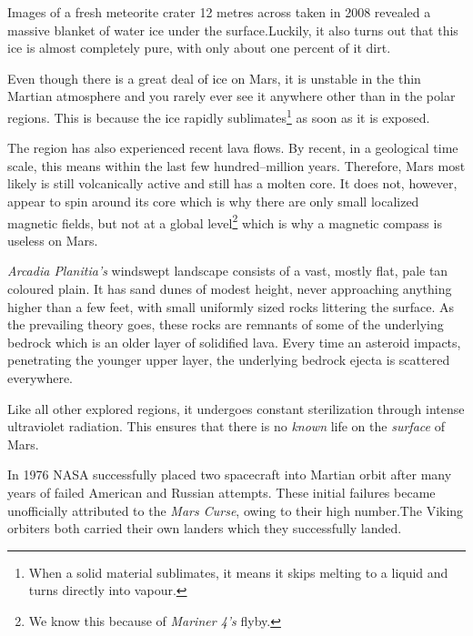 Images of a fresh meteorite crater 12 metres across taken in 2008 revealed a massive blanket of water ice under the surface. Luckily, it also turns out that this ice is almost completely pure, with only about one percent of it dirt.

Even though there is a great deal of ice on Mars, it is unstable in the thin Martian atmosphere and you rarely ever see it anywhere other than in the polar regions. This is because the ice rapidly sublimates\footnote{When a solid material sublimates, it means it skips melting to a liquid and turns directly into vapour.} as soon as it is exposed.

The region has also experienced recent lava flows. By recent, in a geological time scale, this means within the last few hundred--million years. Therefore, Mars most likely is still volcanically active and still has a molten core. It does not, however, appear to spin around its core which is why there are only small localized magnetic fields, but not at a global level\footnote{We know this because of {\it Mariner 4's} flyby.} which is why a magnetic compass is useless on Mars.

    {}
    {}
    {}
    \stopcombination

{\it Arcadia Planitia's} windswept landscape consists of a vast, mostly flat, pale tan coloured plain. It has sand dunes of modest height, never approaching anything higher than a few feet, with small uniformly sized rocks littering the surface. As the prevailing theory goes, these rocks are remnants of some of the underlying bedrock which is an older layer of solidified lava. Every time an asteroid impacts, penetrating the younger upper layer, the underlying bedrock ejecta is scattered everywhere.

Like all other explored regions, it undergoes constant sterilization through intense ultraviolet radiation. This ensures that there is no {\it known} life on the {\it surface} of Mars.


In 1976 NASA successfully placed two spacecraft into Martian orbit after many years of failed American and Russian attempts. These initial failures became unofficially attributed to the {\it Mars Curse}, owing to their high number. The Viking orbiters both carried their own landers which they successfully landed. 

